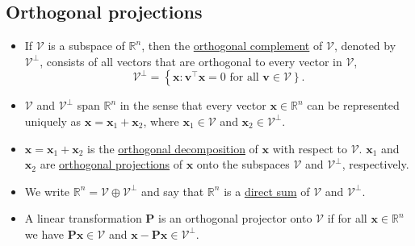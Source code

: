 \documentclass[12pt,thmsa]{article}
\begin{document}
\subsection{Orthogonal projections}
\begin{itemize}
	\item If \(\mathcal{V}\) is a subspace of \(\mathbb{R}^{n}\), then the \underline{orthogonal complement} of \(\mathcal{V}\), denoted by \(\mathcal{V}^{\perp}\), consists of all vectors that are orthogonal to every vector in \(\mathcal{V}\),
	\[\mathcal{V}^{\perp}=\left\{\boldsymbol{x}: \boldsymbol{v}^{\top} \boldsymbol{x}=0\right. \text{ for all }  \left.\boldsymbol{v} \in \mathcal{V}\right\}. \]
	
	\item \(\mathcal{V}\) and \(\mathcal{V}^{\perp}\) span \(\mathbb{R}^{n}\) in the sense that every vector \(\boldsymbol{x} \in \mathbb{R}^{n}\) can be represented uniquely as \(\boldsymbol{x}=\boldsymbol{x}_{1}+\boldsymbol{x}_{2}\), where \(\boldsymbol{x}_{1} \in \mathcal{V}\) and \(\boldsymbol{x}_{2} \in \mathcal{V}^{\perp}\).
	
	\item \(\boldsymbol{x}=\boldsymbol{x}_{1}+\boldsymbol{x}_{2}\) is the \underline{orthogonal decomposition} of \(\boldsymbol{x}\) with respect to \(\mathcal{V}\). \(\boldsymbol{x}_{1}\) and \(\boldsymbol{x}_{2}\) are \underline{orthogonal projections} of \(\boldsymbol{x}\) onto the subspaces \(\mathcal{V}\) and \(\mathcal{V}^{\perp}\), respectively.
	
	\item We write \(\mathbb{R}^{n}=\mathcal{V} \oplus \mathcal{V}^{\perp}\) and say that \(\mathbb{R}^{n}\) is a \underline{direct sum} of \(\mathcal{V}\) and \(\mathcal{V}^{\perp}\). 
	
	\item A linear transformation \(\boldsymbol{P}\) is an orthogonal projector onto \(\mathcal{V}\) if for all \(\boldsymbol{x} \in \mathbb{R}^{n}\) we have \(\boldsymbol{P} \boldsymbol{x} \in \mathcal{V}\) and \(\boldsymbol{x}-\boldsymbol{P} \boldsymbol{x} \in \mathcal{V}^{\perp}\).
\end{itemize}
\end{document}
